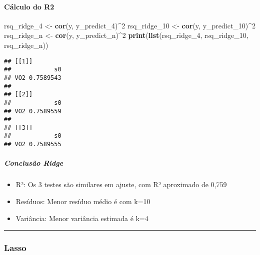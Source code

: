 \documentclass[]{article}
\newenvironment{Shaded}{\begin{snugshade}}{\end{snugshade}}
\newcommand{\DecValTok}[1]{\textcolor[rgb]{0.00,0.00,0.81}{#1}}
\newcommand{\KeywordTok}[1]{\textcolor[rgb]{0.13,0.29,0.53}{\textbf{#1}}}
\newcommand{\NormalTok}[1]{#1}
\newcommand{\OperatorTok}[1]{\textcolor[rgb]{0.81,0.36,0.00}{\textbf{#1}}}
\newcommand{\StringTok}[1]{\textcolor[rgb]{0.31,0.60,0.02}{#1}}
\providecommand{\tightlist}{%
  \setlength{\itemsep}{0pt}\setlength{\parskip}{0pt}}
\let\oldparagraph\paragraph
\renewcommand{\paragraph}[1]{\oldparagraph{#1}\mbox{}}
\let\oldsubparagraph\subparagraph
\renewcommand{\subparagraph}[1]{\oldsubparagraph{#1}\mbox{}}
\begin{document}
\hypertarget{cuxe1lculo-do-r2}{%
\paragraph{Cálculo do R2}\label{cuxe1lculo-do-r2}}

\begin{Shaded}
\begin{Highlighting}[]
\NormalTok{rsq_ridge_}\DecValTok{4}\NormalTok{ <-}\StringTok{ }\KeywordTok{cor}\NormalTok{(y, y_predict_}\DecValTok{4}\NormalTok{)}\OperatorTok{^}\DecValTok{2}
\NormalTok{rsq_ridge_}\DecValTok{10}\NormalTok{ <-}\StringTok{ }\KeywordTok{cor}\NormalTok{(y, y_predict_}\DecValTok{10}\NormalTok{)}\OperatorTok{^}\DecValTok{2}
\NormalTok{rsq_ridge_n <-}\StringTok{ }\KeywordTok{cor}\NormalTok{(y, y_predict_n)}\OperatorTok{^}\DecValTok{2}
\KeywordTok{print}\NormalTok{(}\KeywordTok{list}\NormalTok{(rsq_ridge_}\DecValTok{4}\NormalTok{, rsq_ridge_}\DecValTok{10}\NormalTok{, rsq_ridge_n))}
\end{Highlighting}
\end{Shaded}

\begin{verbatim}
## [[1]]
##            s0
## VO2 0.7589543
## 
## [[2]]
##            s0
## VO2 0.7589559
## 
## [[3]]
##            s0
## VO2 0.7589555
\end{verbatim}

\hypertarget{conclusuxe3o-ridge}{%
\subparagraph{Conclusão Ridge}\label{conclusuxe3o-ridge}}

\begin{itemize}
\tightlist
\item
  R²: Os 3 testes são similares em ajuste, com R² aproximado de 0,759
\item
  Resíduos: Menor resíduo médio é com k=10
\item
  Variância: Menor variância estimada é k=4
\end{itemize}

\begin{center}\rule{0.5\linewidth}{0.5pt}\end{center}

\hypertarget{lasso-1}{%
\subsubsection{Lasso}\label{lasso-1}}
\end{document}
